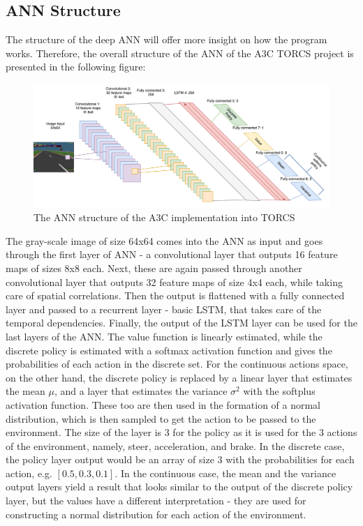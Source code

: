 \subsection{ANN Structure}\label{ANNstructure}
The structure of the deep ANN will offer more insight on how the program works. Therefore, the overall structure of the ANN of the A3C TORCS project is presented in the following figure:
\begin{figure}[H]
	\centering
	\includegraphics[width=1.25\textwidth]{Figures/A3CTorcs}
	\caption{The ANN structure of the A3C implementation into TORCS}
	\label{A3CTorcs}
\end{figure}
The gray-scale image of size 64x64 comes into the ANN as input and goes through the first layer of ANN - a convolutional layer that outputs 16 feature maps of sizes 8x8 each. Next, these are again passed through another convolutional layer that outputs 32 feature maps of size 4x4 each, while taking care of spatial correlations. Then the output is flattened with a fully connected layer and passed to a recurrent layer - basic LSTM, that takes care of the temporal dependencies. Finally, the output of the LSTM layer can be used for the last layers of the ANN. The value function is linearly estimated, while the discrete policy is estimated with a softmax activation function and gives the probabilities of each action in the discrete set. For the continuous actions space, on the other hand, the discrete policy is replaced by a linear layer that estimates the mean $\mu$, and a layer that estimates the variance $\sigma^2$ with the softplus activation function. These too are then used in the formation of a normal distribution, which is then sampled to get the action to be passed to the environment. The size of the layer is 3 for the policy as it is used for the 3 actions of the environment, namely, steer, acceleration, and brake. In the discrete case, the policy layer output would be an array of size 3 with the probabilities for each action, e.g. $\left [ 0.5, 0.3, 0.1 \right ]$. In the continuous case, the mean and the variance output layers yield a result that looks similar to the output of the discrete policy layer, but the values have a different interpretation - they are used for constructing a normal distribution for each action of the environment.

